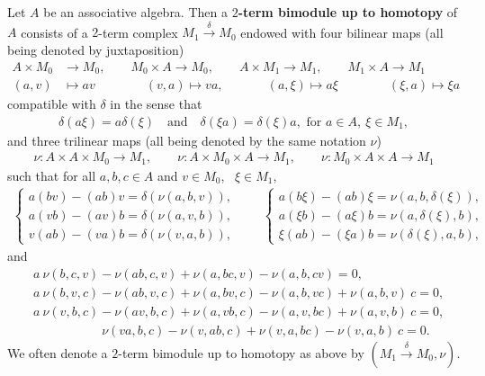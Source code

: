 \documentclass[10pt,a4paper]{amsart}
\begin{document}
\begin{defn}
    Let $A$ be an associative algebra. Then a {\bf $2$-term bimodule up to homotopy} of $A$ consists of a $2$-term complex $M_1 \xrightarrow{\delta} M_0$ endowed with four bilinear maps (all being denoted by juxtaposition)
    \begin{align*}
        A \times M_0 &\rightarrow M_0, \qquad M_0 \times A \rightarrow M_0, \qquad A \times M_1 \rightarrow M_1, \qquad M_1 \times A \rightarrow M_1 \\
        (a, v) & \mapsto av \quad \qquad \quad (v, a) \mapsto va, ~~ \quad \quad \quad (a, \xi) \mapsto a \xi \qquad \qquad (\xi, a) \mapsto \xi a
    \end{align*}
    compatible with $\delta$ in the sense that
    \begin{align}
        \delta (a \xi) = a \delta (\xi) ~~~ \text{ and } ~~~ \delta (\xi a) = \delta (\xi) a, \text{ for } a \in A, ~ \! \xi \in M_1,
    \end{align}
    and three trilinear maps (all being denoted by the same notation $\nu$)
    \begin{align*}
        \nu: A \times A \times M_0 \rightarrow M_1, \qquad \nu : A \times M_0 \times A \rightarrow M_1, \qquad \nu : M_0 \times A \times A \rightarrow M_1 
    \end{align*}
    such that for all $a, b, c \in A$ and $v \in M_0$, ~$\xi \in M_1$,
    \begin{align*}
\begin{cases}
    a (b v) - (ab) v = \delta (\nu (a, b, v)),\\
    a ( v b) - (a v) b = \delta (\nu (a, v, b)),\\
    v (a b) - (v a) b = \delta (\nu (v, a, b)),
\end{cases}
\qquad 
\begin{cases}
    a (b \xi) - (a b) \xi = \nu (a, b, \delta (\xi)), \\
    a (\xi b) - (a \xi) b = \nu (a, \delta (\xi), b), \\
    \xi (a b) - (\xi a) b = \nu (\delta (\xi), a, b),
\end{cases}
    \end{align*}
    and
    \begin{align}
        &a ~ \! \nu (b,c, v) - \nu (ab, c, v) + \nu (a, bc, v) - \nu (a, b, c v) = 0, \label{id-nu1}\\
        &a ~  \! \nu (b, v, c) - \nu (ab, v, c) + \nu (a, bv, c) - \nu (a, b, v c) + \nu (a, b, v) ~ \! c = 0, \label{id-nu2}\\
        & a ~ \! \nu (v, b, c) - \nu (a v, b, c) + \nu (a, v b, c) - \nu (a, v, bc) + \nu (a, v, b) ~ \! c =0, \label{id-nu3}\\
        & ~ ~ \qquad \qquad \quad \nu (v a, b, c) - \nu (v, ab, c) + \nu (v, a, b c) - \nu (v, a, b) ~ \! c = 0. \label{id-nu4}
    \end{align}
    We often denote a $2$-term bimodule up to homotopy as above by $(M_1 \xrightarrow{\delta} M_0, \nu)$.
\end{defn}
\end{document}
